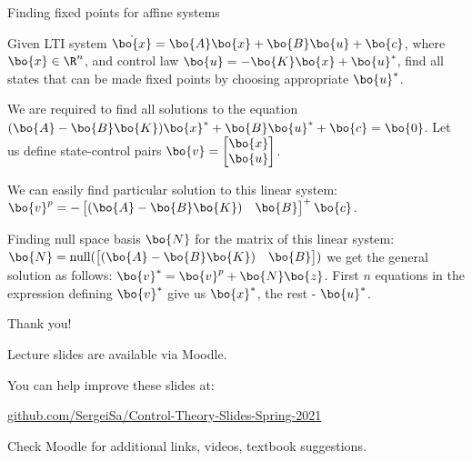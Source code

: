 \documentclass{beamer}
\begin{document}
\begin{frame}{Finding fixed points for affine systems}
\begin{flushleft}

Given LTI system $\dot{\bo{x}} = \bo{A} \bo{x} + \bo{B} \bo{u} + \bo{c}$, where $\bo{x} \in \R^n$, and control law $\bo{u} = -\bo{K}\bo{x} + \bo{u}^*$, find all states that can be made fixed points by choosing appropriate $\bo{u}^*$.

\bigskip

We are required to find all solutions to the equation $(\bo{A} - \bo{B}\bo{K})\bo{x}^* + \bo{B}\bo{u}^* + \bo{c} = \bo{0}$. Let us define state-control pairs $\bo{v} = \begin{bmatrix} \bo{x} \\ \bo{u} \end{bmatrix}$. 

\bigskip

We can easily find particular solution to this linear system: $\bo{v}^p = -\begin{bmatrix} (\bo{A} - \bo{B}\bo{K}) & \bo{B} \end{bmatrix}^+\bo{c}$. 

\bigskip

Finding null space basis $\bo{N}$ for the matrix of this linear system: $\bo{N} = \text{null}(\begin{bmatrix} (\bo{A} - \bo{B}\bo{K}) & \bo{B} \end{bmatrix})$ we get the general solution as follows: $\bo{v}^* = \bo{v}^p + \bo{N}\bo{z}$. First $n$ equations in the expression defining $\bo{v}^*$ give us $\bo{x}^*$, the rest - $\bo{u}^*$.

\end{flushleft}
\end{frame}




\begin{frame}{Thank you!}
\centerline{Lecture slides are available via Moodle.}
\bigskip
\centerline{You can help improve these slides at:}
\centerline{\href{https://github.com/SergeiSa/Control-Theory-Slides-Spring-2021}{github.com/SergeiSa/Control-Theory-Slides-Spring-2021}}
\bigskip
\centerline{Check Moodle for additional links, videos, textbook suggestions.}
\end{frame}
\end{document}
